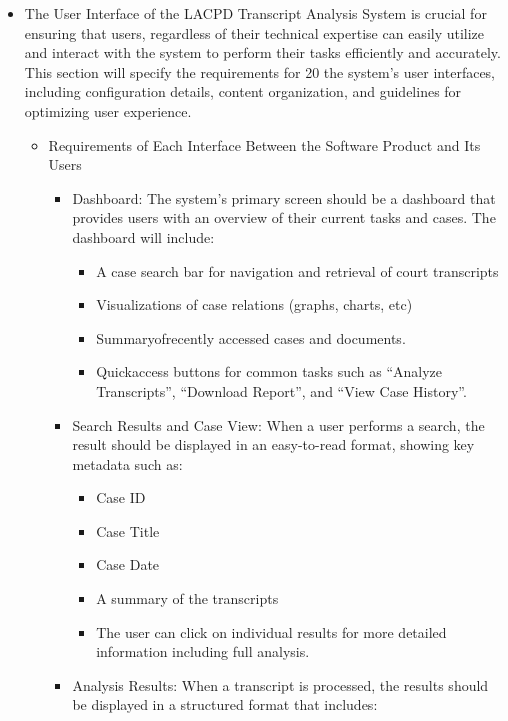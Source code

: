 \documentclass[12pt]{article}
\begin{document}
\begin{itemize}
  \item The User Interface of the LACPD Transcript Analysis System is crucial for ensuring that
 users, regardless of their technical expertise can easily utilize and interact with the system to
 perform their tasks efficiently and accurately. This section will specify the requirements for
20 the system's user interfaces, including configuration details, content organization, and guidelines for optimizing user experience.
	\begin{itemize}
		\item   Requirements of Each Interface Between the Software Product and Its Users
		\begin{itemize}
			\item  Dashboard: The system's primary screen should be a dashboard that provides users with an overview of their current tasks and cases. The dashboard will include:
			\begin{itemize}
				\item  A case search bar for navigation and retrieval of court transcripts
				\item Visualizations of case relations (graphs, charts, etc)
				\item Summaryofrecently accessed cases and documents.
				\item Quickaccess buttons for common tasks such as “Analyze Transcripts”, “Download Report”, and “View Case History”.
			\end{itemize}
		\end{itemize}
		\begin{itemize}
			\item   Search Results and Case View: When a user performs a search, the result should be displayed in an easy-to-read format, showing key metadata such as:
			\begin{itemize}
				\item   Case ID
				\item Case Title
				\item Case Date
				\item A summary of the transcripts
				\item  The user can click on individual results for more detailed information including full analysis.
			\end{itemize}
		\end{itemize}
		\begin{itemize}
			\item Analysis Results: When a transcript is processed, the results should be displayed in a structured format that includes:

\end{itemize}
\end{itemize}
\end{itemize}
\end{document}

